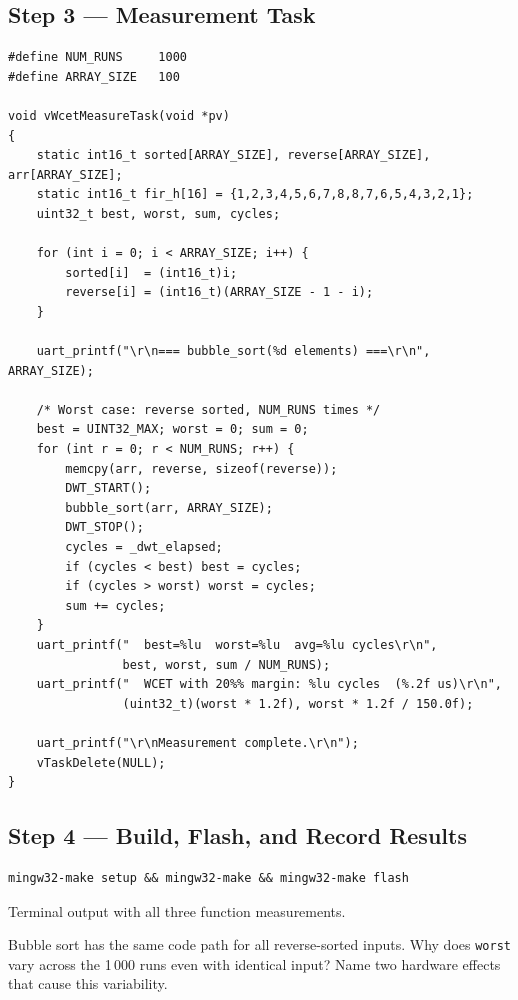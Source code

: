 \documentclass[11pt, a4paper]{article}
\begin{document}
\subsection{Step 3 --- Measurement Task}

\begin{lstlisting}[style=cstyle]
#define NUM_RUNS     1000
#define ARRAY_SIZE   100

void vWcetMeasureTask(void *pv)
{
    static int16_t sorted[ARRAY_SIZE], reverse[ARRAY_SIZE], arr[ARRAY_SIZE];
    static int16_t fir_h[16] = {1,2,3,4,5,6,7,8,8,7,6,5,4,3,2,1};
    uint32_t best, worst, sum, cycles;

    for (int i = 0; i < ARRAY_SIZE; i++) {
        sorted[i]  = (int16_t)i;
        reverse[i] = (int16_t)(ARRAY_SIZE - 1 - i);
    }

    uart_printf("\r\n=== bubble_sort(%d elements) ===\r\n", ARRAY_SIZE);

    /* Worst case: reverse sorted, NUM_RUNS times */
    best = UINT32_MAX; worst = 0; sum = 0;
    for (int r = 0; r < NUM_RUNS; r++) {
        memcpy(arr, reverse, sizeof(reverse));
        DWT_START();
        bubble_sort(arr, ARRAY_SIZE);
        DWT_STOP();
        cycles = _dwt_elapsed;
        if (cycles < best) best = cycles;
        if (cycles > worst) worst = cycles;
        sum += cycles;
    }
    uart_printf("  best=%lu  worst=%lu  avg=%lu cycles\r\n",
                best, worst, sum / NUM_RUNS);
    uart_printf("  WCET with 20%% margin: %lu cycles  (%.2f us)\r\n",
                (uint32_t)(worst * 1.2f), worst * 1.2f / 150.0f);

    uart_printf("\r\nMeasurement complete.\r\n");
    vTaskDelete(NULL);
}
\end{lstlisting}

\subsection{Step 4 --- Build, Flash, and Record Results}

\begin{lstlisting}[style=bashstyle]
mingw32-make setup && mingw32-make && mingw32-make flash
\end{lstlisting}

\begin{checkpointbox}[~A]
  Terminal output with all three function measurements.
\end{checkpointbox}

\begin{questionbox}[~A1]
  Bubble sort has the same code path for all reverse-sorted inputs. Why does
  \texttt{worst} vary across the 1\,000 runs even with identical input? Name two
  hardware effects that cause this variability.
\end{questionbox}
\end{document}
